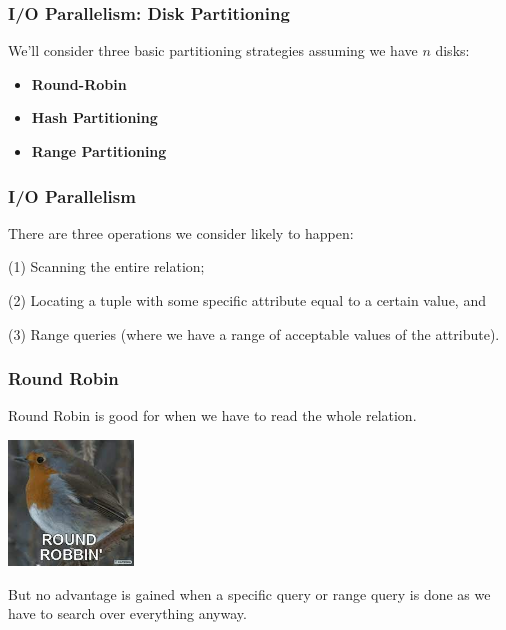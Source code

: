 \begin{frame}
\frametitle{I/O Parallelism: Disk Partitioning}

We'll consider three basic partitioning strategies assuming we have $n$ disks:
\begin{itemize}
	\item \textbf{Round-Robin}
	\item \textbf{Hash Partitioning}
	\item \textbf{Range Partitioning}
\end{itemize}

\end{frame}


\begin{frame}
\frametitle{I/O Parallelism}

There are three operations we consider likely to happen:

(1) Scanning the entire relation; 

(2) Locating a tuple with some specific attribute equal to a certain value, and 

(3) Range queries (where we have a range of acceptable values of the attribute).

\end{frame}

\begin{frame}
\frametitle{Round Robin}

Round Robin is good for when we have to read the whole relation. 

\begin{center}
	\includegraphics[width=0.25\textwidth]{images/rr.jpg}
\end{center}

But no advantage is gained when a specific query or range query is done as we have to search over everything anyway.

\end{frame}

